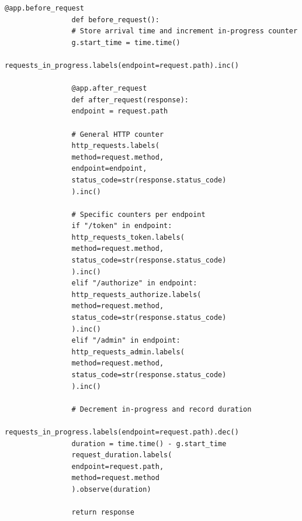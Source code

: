 \documentclass[12pt, a4paper]{article}
\begin{document}
			\begin{lstlisting}[style=python, caption=Decoradores before y after request]
				@app.before_request
				def before_request():
				# Store arrival time and increment in-progress counter
				g.start_time = time.time()
				requests_in_progress.labels(endpoint=request.path).inc()
				
				@app.after_request
				def after_request(response):
				endpoint = request.path
				
				# General HTTP counter
				http_requests.labels(
				method=request.method,
				endpoint=endpoint,
				status_code=str(response.status_code)
				).inc()
				
				# Specific counters per endpoint
				if "/token" in endpoint:
				http_requests_token.labels(
				method=request.method,
				status_code=str(response.status_code)
				).inc()
				elif "/authorize" in endpoint:
				http_requests_authorize.labels(
				method=request.method,
				status_code=str(response.status_code)
				).inc()
				elif "/admin" in endpoint:
				http_requests_admin.labels(
				method=request.method,
				status_code=str(response.status_code)
				).inc()
				
				# Decrement in-progress and record duration
				requests_in_progress.labels(endpoint=request.path).dec()
				duration = time.time() - g.start_time
				request_duration.labels(
				endpoint=request.path,
				method=request.method
				).observe(duration)
				
				return response
			\end{lstlisting}
		
		
\end{document}
